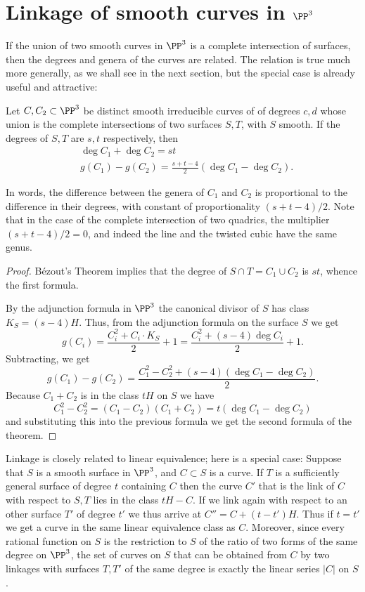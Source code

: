 \section{Linkage of smooth curves in $\PP^3$}\label{SLinkage}\label{linkage section}

If the union of two smooth curves in $\PP^3$ is a complete intersection of surfaces, then the degrees and genera
of the curves are related. The relation is true much more generally, as we shall see in the next section, but the special
case is already useful and attractive:

\begin{theorem}\label{liaison genus formula-first version} Let $C, {C_2}\subset \PP^3$ be distinct smooth irreducible curves of  of degrees $c,d$ whose union is the complete intersections of two surfaces $S,T$, with $S$ smooth. If the degrees of $S,T$ are $s,t$ respectively, then
$$
\begin{aligned}
&\deg C_1+\deg C_2 = st\\
&g(C_1) - g({C_2}) = \frac{s+t-4}{2}(\deg C_1-\deg {C_2}).
\end{aligned}
 $$
\end{theorem}
In words, the difference between the genera of $C_1$ and ${C_2}$ is proportional to the difference in their degrees, with constant of proportionality $(s+t-4)/2$. Note that in the case of the complete intersection of two quadrics, the multiplier $(s+t-4)/2 = 0$, and indeed the line and the twisted cubic have the same genus.

\begin{proof}
B\'ezout's Theorem implies that the degree of $S\cap T = C_1\cup C_2$ is $st$, whence the first formula.

By the adjunction formula in $\PP^3$ the canonical divisor of $S$ has class $K_S = (s-4)H$. Thus, from the 
adjunction formula on the surface $S$ we get
$$
g(C_i) = \frac{C_i^2+C_i\cdot K_S}{2}+1 = \frac{C_i^2+(s-4) \deg C_i}{2}+1.
$$
Subtracting, we get
$$
g(C_1)-g(C_2) = \frac{C_1^2-C_2^2+(s-4) (\deg C_1-\deg C_2)} {2}.
$$
Because $C_1+C_2$ is in the class $tH$ on $S$ we have
$$
C_1^2-C_2^2 = (C_1-C_2)(C_1+C_2) = t(\deg C_1-\deg C_2)
$$
and substituting this into the previous formula we get the second formula of the theorem.
\end{proof}

\begin{remark}
Linkage is closely related to linear equivalence; here is a special case:
Suppose that $S$ is a smooth surface in $\PP^3$, and $C\subset S$ is a curve. If $T$ is a sufficiently general surface of degree $t$
containing $C$ then the curve $C'$ that is the link of $C$ with respect to $S,T$ lies in the class $tH-C$. If we link again with
respect to an other surface $T'$ of degree $t'$ we thus arrive at $C'' = C+(t-t')H$. Thus if $t=t'$ we get a curve in the same 
linear equivalence class as $C$. Moreover, since every rational function on $S$ is the restriction to $S$ of the ratio of two forms of the same degree on $\PP^3$,
the set of curves on $S$ that can be obtained from $C$ by two linkages with surfaces $T, T'$ of the same degree is exactly the 
linear series $|C|$ on $S$.
\end{remark}

